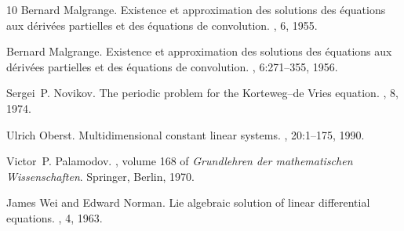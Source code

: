 \documentclass[11pt]{article}
\theoremstyle{plain}
\theoremstyle{definition}
\theoremstyle{remark}
\begin{document}
\begin{thebibliography}{10}
Bernard Malgrange.
\newblock Existence et approximation des solutions des \'equations aux
  d\'eriv\'ees partielles et des \'equations de convolution.
, 6, 1955.

Bernard Malgrange.
\newblock Existence et approximation des solutions des {\'e}quations aux
  d{\'e}riv{\'e}es partielles et des {\'e}quations de convolution.
, 6:271--355, 1956.

Sergei~P. Novikov.
\newblock The periodic problem for the {K}orteweg--de {V}ries equation.
, 8, 1974.

Ulrich Oberst.
\newblock Multidimensional constant linear systems.
, 20:1--175, 1990.

Victor~P. Palamodov.
,
  volume 168 of {\em Grundlehren der mathematischen Wissenschaften}.
\newblock Springer, Berlin, 1970.

James Wei and Edward Norman.
\newblock Lie algebraic solution of linear differential equations.
, 4, 1963.

\end{thebibliography}
\end{document}
